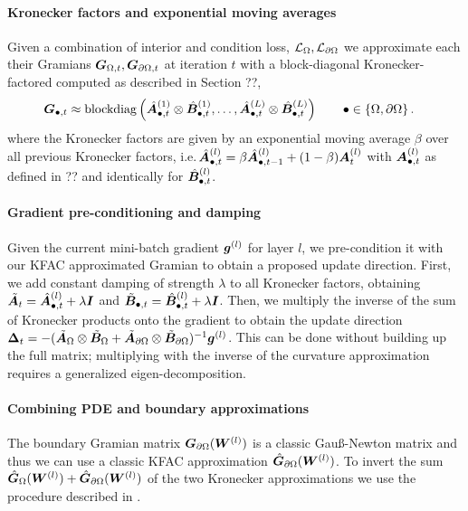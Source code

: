 \paragraph{Kronecker factors and exponential moving averages} Given a combination of interior and condition loss, ${\mathcal{L}}_{\Omega},{\mathcal{L}}_{\partial\Omega}$ we approximate each their Gramians ${\bm{G}}_{\Omega,t}, {\bm{G}}_{\partial \Omega, t}$ at iteration $t$ with a block-diagonal Kronecker-factored computed as described in Section ??,
\begin{align*}
  {\bm{G}}_{\bullet, t}
  &\approx
    \operatorname{blockdiag}
    \left(
    \hat{{\bm{A}}}^{(1)}_{\bullet,t} \otimes \hat{{\bm{B}}}_{\bullet,t}^{(1)},
    \dots,
    \hat{{\bm{A}}}^{(L)}_{\bullet,t} \otimes \hat{{\bm{B}}}_{\bullet,t}^{(L)}
    \right)
    \qquad \bullet \in \{ \Omega, \partial\Omega\}\,.
\end{align*}
where the Kronecker factors are given by an exponential moving average $\beta$ over all previous Kronecker factors, i.e.\,$\hat{{\bm{A}}}^{(l)}_{\bullet,t} = \beta \hat{{\bm{A}}}^{(l)}_{\bullet,t-1} + (1 - \beta) {\bm{A}}^{(l)}_t$ with ${\bm{A}}^{(l)}_{\bullet, t}$ as defined in ?? and identically for $\hat{{\bm{B}}}^{(l)}_{\bullet, t}$.

\paragraph{Gradient pre-conditioning and damping}
Given the current mini-batch gradient ${\bm{g}}^{(l)}$ for layer $l$, we pre-condition it with our KFAC approximated Gramian to obtain a proposed update direction.
First, we add constant damping of strength $\lambda$ to all Kronecker factors, obtaining $\tilde{{\bm{A}}}_t = \hat{{\bm{A}}}^{(l)}_{\bullet,t} + \lambda {\bm{I}}$ and $\tilde{{\bm{B}}}_{\bullet,t} = \hat{{\bm{B}}}^{(l)}_{\bullet,t} + \lambda {\bm{I}}$.
Then, we multiply the inverse of the sum of Kronecker products onto the gradient to obtain the update direction ${\bm{\Delta}}_t = -(\tilde{{\bm{A}}}_{\Omega} \otimes \tilde{{\bm{B}}}_{\Omega} + \tilde{{\bm{A}}}_{\partial\Omega} \otimes \tilde{{\bm{B}}}_{\partial\Omega})^{-1} {\bm{g}}^{(l)}$.
This can be done without building up the full matrix; multiplying with the inverse of the curvature approximation requires a generalized eigen-decomposition.

\paragraph{Combining PDE and boundary approximations}
The boundary Gramian matrix ${\bm{G}}_{\partial\Omega}({\bm{W}}^{(l)})$ is a classic Gauß-Newton matrix and thus we can use a classic KFAC approximation $\hat{{\bm{G}}}_{\partial\Omega}({\bm{W}}^{(l)})$. 
To invert the sum $\hat{{\bm{G}}}_\Omega({\bm{W}}^{(l)}) + \hat{{\bm{G}}}_{\partial\Omega}({\bm{W}}^{(l)})$ of the two Kronecker approximations we use the procedure described in \cite[Appendix I]{martens2015optimizing}.

